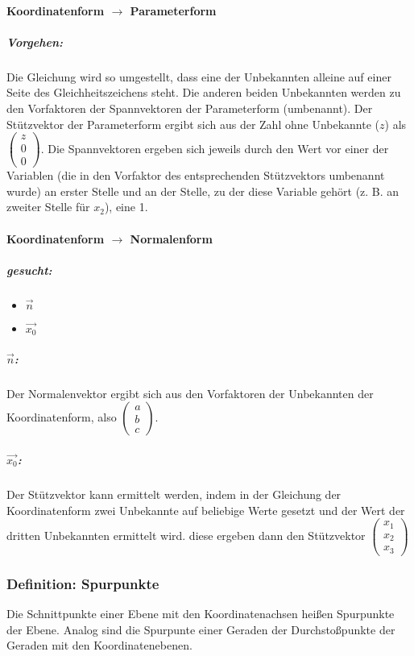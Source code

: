 \documentclass{article}
\begin{document}
  \paragraph{Koordinatenform $\rightarrow$ Parameterform} 
  \subparagraph{Vorgehen:}
  Die Gleichung wird so umgestellt, dass eine der Unbekannten alleine auf einer Seite des Gleichheitszeichens steht. Die anderen beiden Unbekannten werden zu den Vorfaktoren der Spannvektoren der Parameterform (umbenannt). Der Stützvektor der Parameterform ergibt sich aus der Zahl ohne Unbekannte ($z$) als 
  $\begin{pmatrix}
  	z \\
  	0 \\
  	0
  \end{pmatrix}$. 
  Die Spannvektoren ergeben sich jeweils durch den Wert vor einer der Variablen (die in den Vorfaktor des entsprechenden Stützvektors umbenannt wurde) an erster Stelle und an der Stelle, zu der diese Variable gehört (z. B. an zweiter Stelle für $x_2$), eine 1.
  
  \paragraph{Koordinatenform $\rightarrow$ Normalenform}
  \subparagraph{gesucht:} 
  \begin{itemize}
  	\item $\vec{n}$
  	\item $\vec{x_0}$
  \end{itemize}
  
  \subparagraph{$\vec{n}$:}
  Der Normalenvektor ergibt sich aus den Vorfaktoren der Unbekannten der Koordinatenform, also 
  $\begin{pmatrix}
  	a \\
  	b \\
  	c
  \end{pmatrix}$. 
  
  \subparagraph{$\vec{x_0}$:}
  Der Stützvektor kann ermittelt werden, indem in der Gleichung der Koordinatenform zwei Unbekannte auf beliebige Werte gesetzt und der Wert der dritten Unbekannten ermittelt wird. diese ergeben dann den Stützvektor 
  $\begin{pmatrix}
  	x_1 \\
  	x_2 \\
  	x_3
  \end{pmatrix}$
  
  \subsubsection{Definition: Spurpunkte}
  Die Schnittpunkte einer Ebene mit den Koordinatenachsen heißen Spurpunkte der Ebene. Analog sind die Spurpunte einer Geraden der Durchstoßpunkte der Geraden mit den Koordinatenebenen.
  
\end{document}
